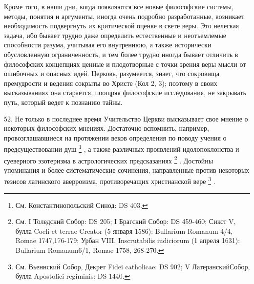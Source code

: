 \documentclass[a5paper,10pt]{article}
\begin{document}
Кроме того, в наши дни, когда появляются все новые философские системы, методы,
понятия и аргументы, иногда очень подробно разработанные, возникает
необходимость подвергнуть их критической оценке в свете веры. Это нелегкая
задача, ибо бывает трудно даже определить естественные и неотъемлемые
способности разума, учитывая его внутреннюю, а также исторически обусловленную
ограниченность, и тем более трудно иногда бывает отличить в философских
концепциях ценные и плодотворные с точки зрения веры мысли от ошибочных и
опасных идей. Церковь, разумеется, знает, что сокровища премудрости и ведения
сокрыты во Христе (Кол 2, 3); поэтому в своих высказываниях она старается,
поощряя философские исследования, не закрывать путь, который ведет к познанию
тайны.

52. Не только в последнее время Учительство Церкви высказывает свое мнение о
некоторых философских мнениях. Достаточно вспомнить, например,
провозглашавшиеся на протяжении веков определения по поводу учения о
предсуществовании душ \footnote{См. Константинопольский Синод: DS 403.}  , а
также различных проявлений идолопоклонства и суеверного эзотеризма в
астрологических предсказаниях \footnote{См. I Толедский Собор: DS 205; I
    Брагский Собор: DS 459-460; Сикст V, булла Coeli et terrae Creator (5
    января 1586): Bullarium Romanum 4/4, Romae 1747,176-179; Урбан VIII,
Inscrutabilis iudiciorum (1 апреля 1631): Bullarium Romanum6/1, Romae 1758,
268-270.}  .  Достойны упоминания и более систематические сочинения,
направленные против некоторых тезисов латинского аверроизма, противоречащих
христианской вере \footnote{См. Вьеннский Собор, Декрет Fidei catholicae: DS
902; V ЛатеранскийСобор, булла Apostolici regiminis: DS 1440.}  .
\end{document}
